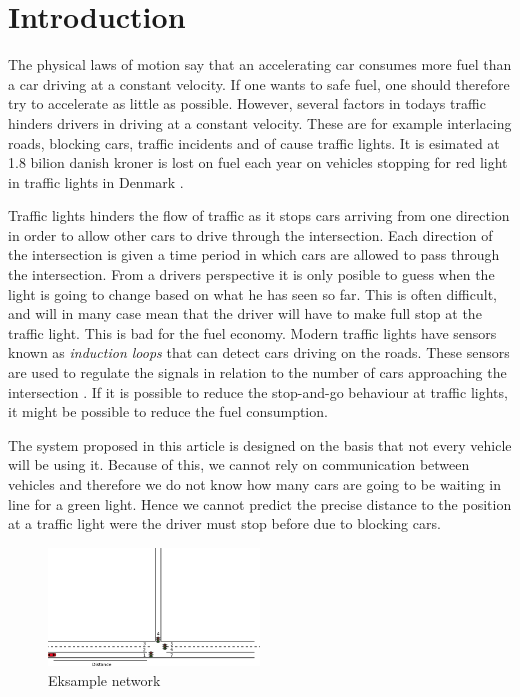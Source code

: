 \section{Introduction}

The physical laws of motion say that an accelerating car consumes more fuel than a car driving at a constant velocity. %
If one wants to safe fuel, one should therefore try to accelerate as little as possible. 
However, several factors in todays traffic hinders drivers in driving at a constant velocity. 
These are for example interlacing roads, blocking cars, traffic incidents and of cause traffic lights. 
It is esimated at 1.8 bilion danish kroner is lost on fuel each year on vehicles stopping for red light in traffic lights in Denmark \cite{Vejdir}.

Traffic lights hinders the flow of traffic as it stops cars arriving from one direction in order to allow other cars to drive through the intersection.
Each direction of the intersection is given a time period in which cars are allowed to pass through the intersection. 
From a drivers perspective it is only posible to guess when the light is going to change based on what he has seen so far. 
This is often difficult, and will in many case mean that the driver will have to make full stop at the traffic light. This is bad for the fuel economy.
Modern traffic lights have sensors known as \textit{induction loops} that can detect cars driving on the roads.
These sensors are used to regulate the signals in relation to the number of cars approaching the intersection \cite{Vejdir}.
If it is possible to reduce the stop-and-go behaviour at traffic lights, it might be possible to reduce the fuel consumption.




The system proposed in this article is designed on the basis that not every vehicle will be using it. 
Because of this, we cannot rely on communication between vehicles and therefore we do not know how many cars are going to be waiting in line for a green light. %
Hence we cannot predict the precise distance to the position at a traffic light were the driver must stop before due to blocking cars.

\begin{figure}[htb]
\centering
\includegraphics[width=0.5\textwidth]{images/introNetwork.png}
\caption{Eksample network}
\label{fig:Introduction:network}
\end{figure}


